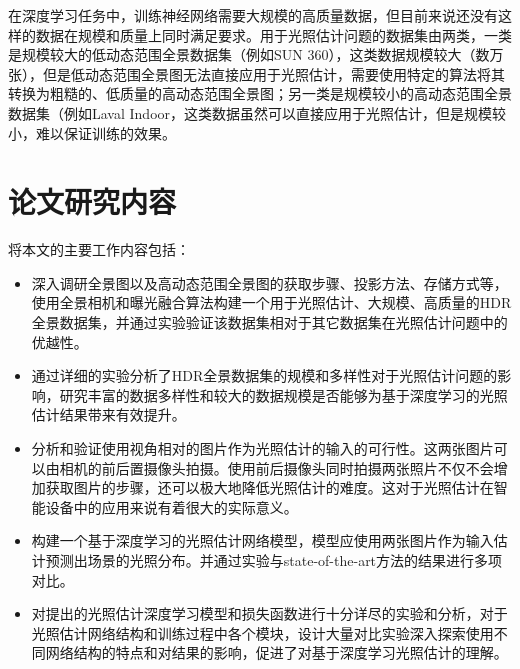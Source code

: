 在深度学习任务中，训练神经网络需要大规模的高质量数据，但目前来说还没有这样的数据在规模和质量上同时满足要求。用于光照估计问题的数据集由两类，一类是规模较大的低动态范围全景数据集（例如SUN 360\cite{xiao2012recognizing}），这类数据规模较大（数万张），但是低动态范围全景图无法直接应用于光照估计，需要使用特定的算法将其转换为粗糙的、低质量的高动态范围全景图；另一类是规模较小的高动态范围全景数据集（例如Laval Indoor\cite{gardner2017learning}，这类数据虽然可以直接应用于光照估计，但是规模较小，难以保证训练的效果。

\section{论文研究内容}
将本文的主要工作内容包括：
\begin{itemize}
    \item 深入调研全景图以及高动态范围全景图的获取步骤、投影方法、存储方式等，使用全景相机和曝光融合算法构建一个用于光照估计、大规模、高质量的HDR全景数据集，并通过实验验证该数据集相对于其它数据集在光照估计问题中的优越性。
    \item 通过详细的实验分析了HDR全景数据集的规模和多样性对于光照估计问题的影响，研究丰富的数据多样性和较大的数据规模是否能够为基于深度学习的光照估计结果带来有效提升。
    \item 分析和验证使用视角相对的图片作为光照估计的输入的可行性。这两张图片可以由相机的前后置摄像头拍摄。使用前后摄像头同时拍摄两张照片不仅不会增加获取图片的步骤，还可以极大地降低光照估计的难度。这对于光照估计在智能设备中的应用来说有着很大的实际意义。
    \item 构建一个基于深度学习的光照估计网络模型，模型应使用两张图片作为输入估计预测出场景的光照分布。并通过实验与state-of-the-art方法的结果进行多项对比。
    \item 对提出的光照估计深度学习模型和损失函数进行十分详尽的实验和分析，对于光照估计网络结构和训练过程中各个模块，设计大量对比实验深入探索使用不同网络结构的特点和对结果的影响，促进了对基于深度学习光照估计的理解。
\end{itemize}